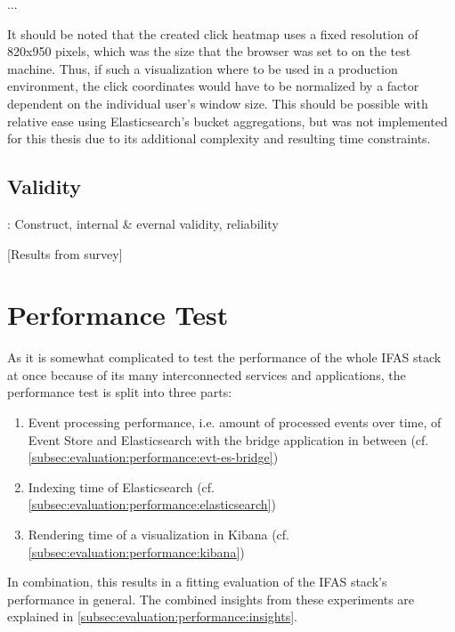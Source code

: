 ...

It should be noted that the created click heatmap uses a fixed resolution of 820x950 pixels, which was the size that the browser was set to on the test machine.
Thus, if such a visualization where to be used in a production environment, the click coordinates would have to be normalized by a factor dependent on the individual user's window size.
This should be possible with relative ease using Elasticsearch's bucket aggregations, but was not implemented for this thesis due to its additional complexity and resulting time constraints.


\subsection{Validity}
\label{subec:evaluation:user:validity}

\cite{Easterbrook2008a}: Construct, internal \& evernal validity, reliability

[Results from survey]

\section{Performance Test}
\label{sec:evaluation:performance}

As it is somewhat complicated to test the performance of the whole \ac{IFAS} stack at once because of its many interconnected services and applications, the performance test is split into three parts:

\begin{enumerate}
\item Event processing performance, i.e. amount of processed events over time, of Event Store and Elasticsearch with the bridge application in between (cf. \cref{subsec:evaluation:performance:evt-es-bridge})
\item Indexing time of Elasticsearch (cf. \cref{subsec:evaluation:performance:elasticsearch})
\item Rendering time of a visualization in Kibana (cf. \cref{subsec:evaluation:performance:kibana})
\end{enumerate}

In combination, this results in a fitting evaluation of the \ac{IFAS} stack's performance in general.
The combined insights from these experiments are explained in \cref{subsec:evaluation:performance:insights}.

